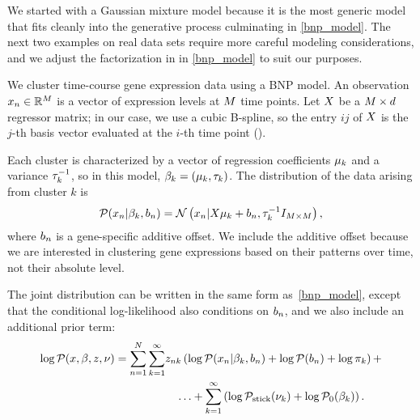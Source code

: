 We started with a Gaussian mixture model
because it is the most generic model that fits cleanly into the
generative process culminating in \eqref{bnp_model}.
The next two examples on real data sets require more careful modeling considerations,
and we adjust the factorization in in \eqref{bnp_model} to suit our purposes.


\begin{ex}

We cluster time-course gene expression data using a BNP model.
An observation $x_n\in\mathbb{R}^M$ is a vector of expression levels at $M$
time points.
Let $X$ be a $M \times d$ regressor matrix;
in our case, we use a cubic B-spline, so the entry $ij$ of $X$
is the $j$-th basis vector evaluated at the $i$-th time point ().

Each cluster is characterized by a vector of regression coefficients
$\mu_k$ and a variance $\tau^{-1}_k$, so
in this model, $\beta_k = (\mu_k, \tau_k)$.
The distribution of the data arising from cluster $k$ is
\begin{align*}
\mathcal{P}(x_n | \beta_k, b_n) =
\mathcal{N}\left(x_n | X\mu_k + b_n,
\tau_k^{-1}I_{M \times M}\right),
\end{align*}
%
where $b_{n}$ is a gene-specific additive offset.
We include the additive offset because we
are interested in clustering gene expressions based on their patterns over time,
not their absolute level.

The joint distribution can be written in the same form as~\eqref{bnp_model},
except that the conditional log-likelihood also conditions on $b_n$,
and we also include an additional prior term:
\begin{align*}
\log \mathcal{P}(x, \beta, z, \nu) =
    \sum_{n=1}^N \sum_{k=1}^{\infty}&
        z_{nk} \left(
            \log \mathcal{P}(x_n \vert \beta_k, b_n) + \log \mathcal{P}(b_n) + \log \pi_k
        \right) +\notag \\
    & \quad \ldots + \sum_{k=1}^{\infty} \left(
        \log \mathcal{P}_{\mathrm{stick}}(\nu_{k}) + \log \mathcal{P}_{0}(\beta_k)
    \right).
\end{align*}

\end{ex}

